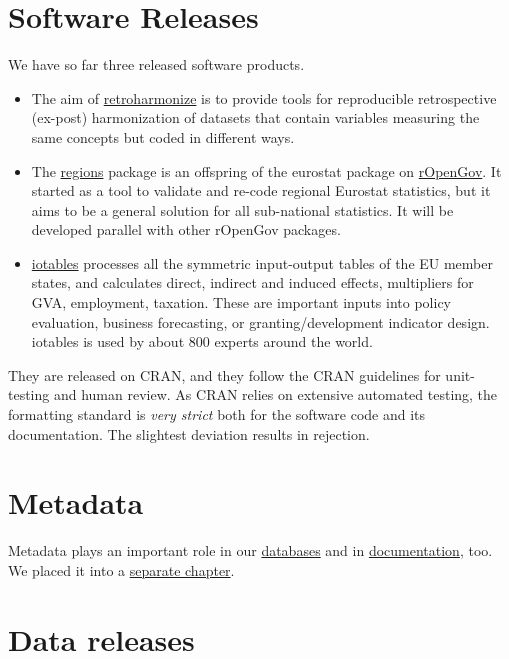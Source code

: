 \documentclass[
  fontsize=13pt,
  english,
  a4paper,
  openany, a4paper, oneside]{book}
\providecommand{\tightlist}{%
  \setlength{\itemsep}{0pt}\setlength{\parskip}{0pt}}
\begin{document}
\hypertarget{software-releases}{%
\section{Software Releases}\label{software-releases}}

We have so far three released software products.

\begin{itemize}
\tightlist
\item
  The aim of \href{https://reprex.nl/software/retroharmonize/}{retroharmonize} is to provide tools for reproducible retrospective (ex-post) harmonization of datasets that contain variables measuring the same concepts but coded in different ways.
\item
  The \href{https://reprex.nl/software/regions/}{regions} package is an offspring of the eurostat package on \href{https://github.com/rOpenGov}{rOpenGov}. It started as a tool to validate and re-code regional Eurostat statistics, but it aims to be a general solution for all sub-national statistics. It will be developed parallel with other rOpenGov packages.
\item
  \href{https://reprex.nl/software/iotables/}{iotables} processes all the symmetric input-output tables of the EU member states, and calculates direct, indirect and induced effects, multipliers for GVA, employment, taxation. These are important inputs into policy evaluation, business forecasting, or granting/development indicator design. iotables is used by about 800 experts around the world.
\end{itemize}

They are released on CRAN, and they follow the CRAN guidelines for unit-testing and human review. As CRAN relies on extensive automated testing, the formatting standard is \emph{very strict} both for the software code and its documentation. The slightest deviation results in rejection.

\hypertarget{documentation-metadata}{%
\section{Metadata}\label{documentation-metadata}}

Metadata plays an important role in our \protect\hyperlink{data-storage}{databases} and in \protect\hyperlink{documentation}{documentation}, too. We placed it into a \protect\hyperlink{metadata}{separate chapter}.

\hypertarget{data-release}{%
\section{Data releases}\label{data-release}}
\end{document}
